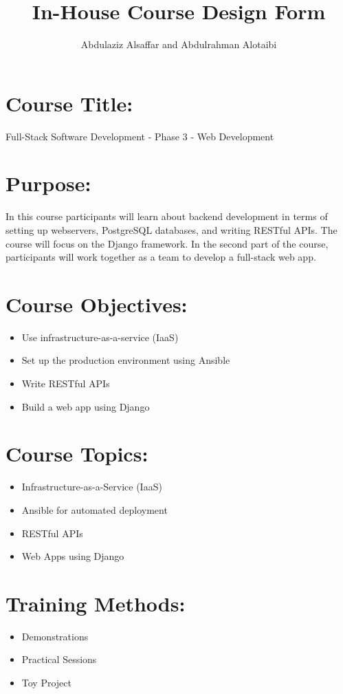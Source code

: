 \documentclass[a4paper,11pt]{article}
\author{Abdulaziz Alsa{f}far and Abdulrahman Alotaibi}
\title{In-House Course Design Form}
\begin{document}
\maketitle
\pagestyle{plain}
\setcounter{page}{1}

\section{Course Title:}
Full-Stack Software Development - Phase 3 - Web Development

\section{Purpose:}
In this course participants will learn about backend development in terms of setting up webservers, PostgreSQL databases, and writing RESTful APIs. The course will focus on the Django framework. In the second part of the course, participants will work together as a team to develop a full-stack web app.

\section{Course Objectives:}
\begin{itemize}
	\item Use infrastructure-as-a-service (IaaS)
	\item Set up the production environment using Ansible
	\item Write RESTful APIs
	\item Build a web app using Django	
\end{itemize}

\section{Course Topics:}
\begin{itemize}
	\item Infrastructure-as-a-Service (IaaS)
	\item Ansible for automated deployment
	\item RESTful APIs
	\item Web Apps using Django
\end{itemize}

\section{Training Methods:}
\begin{itemize}
	\item Demonstrations
	\item Practical Sessions
	\item Toy Project
\end{itemize}
\end{document}
